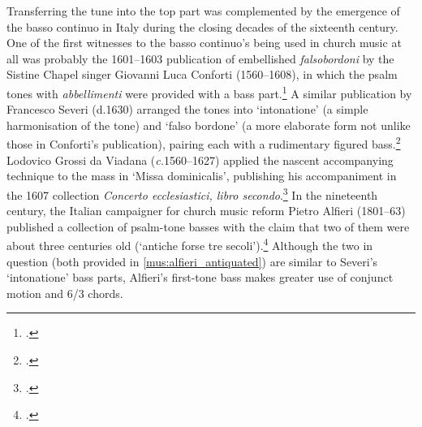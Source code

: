 Transferring the tune into the top part was complemented by the emergence of the basso continuo in Italy during the closing decades of the sixteenth century.
One of the first witnesses to the basso continuo's being used in church music at all was probably the 1601--1603 publication of embellished \emph{falsobordoni} by the Sistine Chapel singer Giovanni Luca Conforti (1560--1608), in which the psalm tones with \emph{abbellimenti} were provided with a bass part.\footcites[230--31]{BradshawPerformancePracticeFalsobordone1997}[p.~xiii]{BradshawGiovanniLucaConforti1985}[5]{BradshawGiovanniLucaConforti2012}
A similar publication by Francesco Severi (d.1630) arranged the tones into `intonatione' (a simple harmonisation of the tone) and `falso bordone' (a more elaborate form not unlike those in Conforti's publication), pairing each with a rudimentary figured bass.\footcite[1--6]{SeveriSalmipassaggiatitutte1615}
Lodovico Grossi da Viadana (\emph{c.}1560--1627) applied the nascent accompanying technique to the mass in `Missa dominicalis', publishing his accompaniment in the 1607 collection \emph{Concerto ecclesiastici, libro secondo}.\footcite[pp.~32, 90]{SoehnerOrgelbegleitunggregorianischenGesang1936}
In the nineteenth century, the Italian campaigner for church music reform Pietro Alfieri (1801--63) published a collection of psalm-tone basses with the claim that two of them were about three centuries old (`antiche forse tre secoli').\footcite[pp.~4--5, 7]{AlfieriAccompagnamentocollOrgano1840}
Although the two in question (both provided in \cref{mus:alfieri_antiquated}) are similar to Severi's `intonatione' bass parts, Alfieri's first-tone bass makes greater use of conjunct motion and 6/3 chords.

